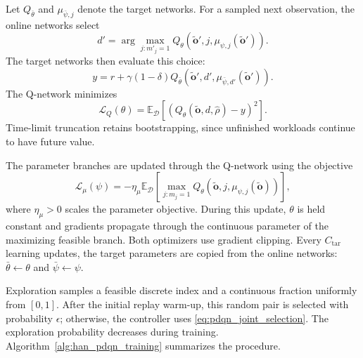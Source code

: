 Let $Q_{\bar{\theta}}$ and $\mu_{\bar{\psi},j}$
denote the target networks. For a sampled next observation,
the online networks select
\begin{equation}
d'
=
\arg\max_{j:m'_j=1}
Q_\theta\left(
\widetilde{\mathbf{o}}',j,
\mu_{\psi,j}(\widetilde{\mathbf{o}}')
\right).
\label{eq:pdqn_next_action}
\end{equation}
The target networks then evaluate this choice:
\begin{equation}
y
=
r+\gamma(1-\delta)
Q_{\bar{\theta}}\left(
\widetilde{\mathbf{o}}',d',
\mu_{\bar{\psi},d'}(\widetilde{\mathbf{o}}')
\right).
\label{eq:pdqn_td_target}
\end{equation}
The Q-network minimizes
\begin{equation}
\mathcal{L}_Q(\theta)
=
\mathbb{E}_{\mathcal{D}}
\left[
\left(
Q_\theta(\widetilde{\mathbf{o}},d,\widehat{\rho})-y
\right)^2
\right].
\label{eq:pdqn_q_loss}
\end{equation}
Time-limit truncation retains bootstrapping, since
unfinished workloads continue to have future value.

The parameter branches are updated through the Q-network
using the objective
\begin{equation}
\mathcal{L}_{\mu}(\psi)
=
-\eta_{\mu}
\mathbb{E}_{\mathcal{D}}
\left[
\max_{j:m_j=1}
Q_\theta\left(
\widetilde{\mathbf{o}},j,
\mu_{\psi,j}(\widetilde{\mathbf{o}})
\right)
\right],
\label{eq:pdqn_parameter_loss}
\end{equation}
where $\eta_{\mu}>0$ scales the parameter objective.
During this update, $\theta$ is held constant and
gradients propagate through the continuous parameter
of the maximizing feasible branch.
Both optimizers use gradient clipping.
Every $C_{\mathrm{tar}}$ learning updates, the target
parameters are copied from the online networks:
$\bar{\theta}\leftarrow\theta$ and
$\bar{\psi}\leftarrow\psi$.

Exploration samples a feasible discrete index and a
continuous fraction uniformly from $[0,1]$.
After the initial replay warm-up, this random pair is
selected with probability $\epsilon$; otherwise, the
controller uses \eqref{eq:pdqn_joint_selection}.
The exploration probability decreases during training.
Algorithm~\ref{alg:han_pdqn_training} summarizes the procedure.

